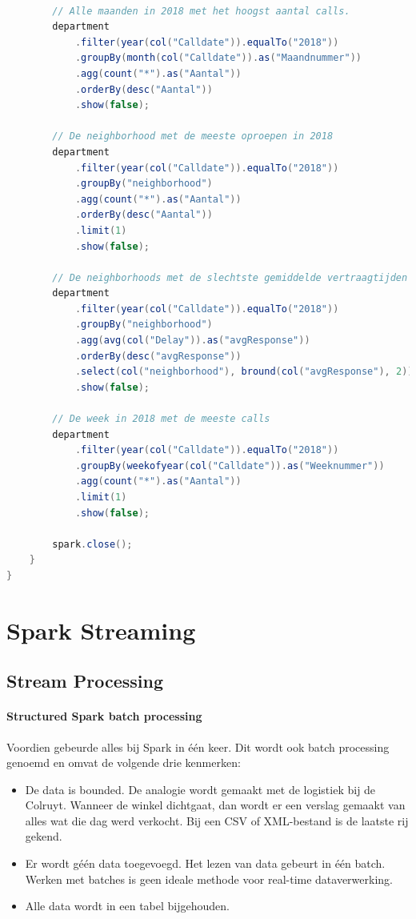 \documentclass[a4paper,10pt,twoside]{report}
\begin{document}
\newpage

\begin{lstlisting}[language=Java]
		
		// Alle maanden in 2018 met het hoogst aantal calls.
		department
			.filter(year(col("Calldate")).equalTo("2018"))
			.groupBy(month(col("Calldate")).as("Maandnummer"))
			.agg(count("*").as("Aantal"))
			.orderBy(desc("Aantal"))
			.show(false);
		
		// De neighborhood met de meeste oproepen in 2018
		department
			.filter(year(col("Calldate")).equalTo("2018"))
			.groupBy("neighborhood")
			.agg(count("*").as("Aantal"))
			.orderBy(desc("Aantal"))
			.limit(1)
			.show(false);
		
		// De neighborhoods met de slechtste gemiddelde vertraagtijden bij een omroep.
		department
			.filter(year(col("Calldate")).equalTo("2018"))
			.groupBy("neighborhood")
			.agg(avg(col("Delay")).as("avgResponse"))
			.orderBy(desc("avgResponse"))
			.select(col("neighborhood"), bround(col("avgResponse"), 2))
			.show(false);
		
		// De week in 2018 met de meeste calls
		department
			.filter(year(col("Calldate")).equalTo("2018"))
			.groupBy(weekofyear(col("Calldate")).as("Weeknummer"))
			.agg(count("*").as("Aantal"))
			.limit(1)
			.show(false);
		
		spark.close();
	}
}
\end{lstlisting}

\chapter{Spark Streaming}

\section{Stream Processing}

\subsubsection{Structured Spark batch processing}

Voordien gebeurde alles bij Spark in één keer. Dit wordt ook batch processing genoemd en omvat de volgende drie kenmerken:

\begin{itemize}
	\item De data is bounded. De analogie wordt gemaakt met de logistiek bij de Colruyt. Wanneer de winkel dichtgaat, dan wordt er een verslag gemaakt van alles wat die dag werd verkocht. Bij een CSV of XML-bestand is de laatste rij gekend.
	\item Er wordt géén data toegevoegd. Het lezen van data gebeurt in één batch. Werken met batches is geen ideale methode voor real-time dataverwerking.
	\item Alle data wordt in een tabel bijgehouden.
\end{itemize}
\end{document}
